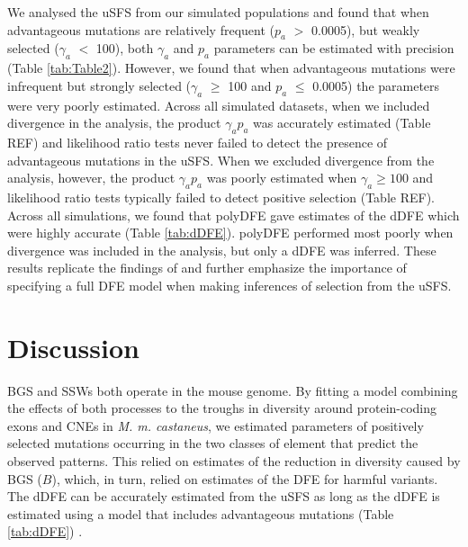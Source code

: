 \documentclass[11pt]{article}
\begin{document}
	
	
	 We analysed the uSFS from our simulated populations and found that when advantageous mutations are relatively frequent ($p_a$ $>$ 0.0005), but weakly selected ($\gamma_a$ $<$ 100), both $\gamma_a$ and $p_a$ parameters can be estimated with precision (Table \ref{tab:Table2}). However, we found that when advantageous mutations were infrequent but strongly selected ($\gamma_a$ $\geq$ 100 and $p_a$ $\leq$ 0.0005) the parameters were very poorly estimated. Across all simulated datasets, when we included divergence in the analysis, the product $\gamma_a p_a$ was accurately estimated (Table REF) and likelihood ratio tests never failed to detect the presence of advantageous mutations in the uSFS. When we excluded divergence from the analysis, however, the product  $\gamma_a p_a$  was poorly estimated when $\gamma_a \geq 100$ and likelihood ratio tests typically failed to detect positive selection (Table REF). Across all simulations, we found that polyDFE gave estimates of the dDFE which were highly accurate (Table \ref{tab:dDFE}). polyDFE performed most poorly when divergence was included in the analysis, but only a dDFE was inferred. These results replicate the findings of \cite{RN354} and further emphasize the importance of specifying a full DFE model when making inferences of selection from the uSFS. 

%
%

\section*{Discussion}

	BGS and SSWs both operate in the mouse genome. By fitting a model combining the effects of both processes to the troughs in diversity around protein-coding exons and CNEs in \textit{M. m. castaneus}, we estimated parameters of positively selected mutations occurring in the two classes of element that predict the observed patterns. This relied on estimates of the reduction in diversity caused by BGS ($B$), which, in turn, relied on estimates of the DFE for harmful variants. The dDFE can be accurately estimated from the uSFS as long as the dDFE is estimated using a model that includes advantageous mutations (Table \ref{tab:dDFE}) \citep{RN354}. 
\end{document}
